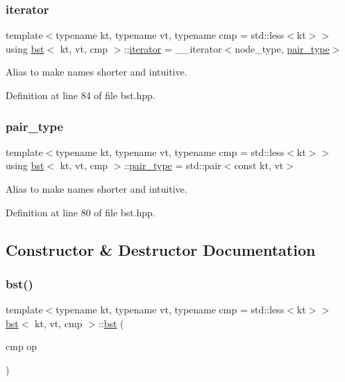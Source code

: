 \subsubsection{\texorpdfstring{iterator}{iterator}}
{\footnotesize\ttfamily template$<$typename kt, typename vt, typename cmp = std\+::less$<$kt$>$$>$ \\
using \hyperlink{classbst}{bst}$<$ kt, vt, cmp $>$\+::\hyperlink{classbst_a429b0445783ff6486882db5dee900ce0}{iterator} =  \+\_\+\+\_\+iterator$<$node\+\_\+type, \hyperlink{classbst_a7b11cca2a3b4394915600194f741ab16}{pair\+\_\+type}$>$}

Alias to make names shorter and intuitive. 

Definition at line 84 of file bst.\+hpp.

\mbox{\label{classbst_a7b11cca2a3b4394915600194f741ab16}} 
\subsubsection{\texorpdfstring{pair\+\_\+type}{pair\_type}}
{\footnotesize\ttfamily template$<$typename kt, typename vt, typename cmp = std\+::less$<$kt$>$$>$ \\
using \hyperlink{classbst}{bst}$<$ kt, vt, cmp $>$\+::\hyperlink{classbst_a7b11cca2a3b4394915600194f741ab16}{pair\+\_\+type} =  std\+::pair$<$const kt, vt$>$}

Alias to make names shorter and intuitive. 

Definition at line 80 of file bst.\+hpp.



\subsection{Constructor \& Destructor Documentation}
\mbox{\label{classbst_a8d0c20c3ace61d4ffde5ab90fbe3226b}} 
\subsubsection{\texorpdfstring{bst()}{bst()}\hspace{0.1cm}{\footnotesize\ttfamily [1/3]}}
{\footnotesize\ttfamily template$<$typename kt, typename vt, typename cmp = std\+::less$<$kt$>$$>$ \\
\hyperlink{classbst}{bst}$<$ kt, vt, cmp $>$\+::\hyperlink{classbst}{bst} (\begin{DoxyParamCaption}\item[{cmp}]{op }\end{DoxyParamCaption})\hspace{0.3cm}{\ttfamily [inline]}}



